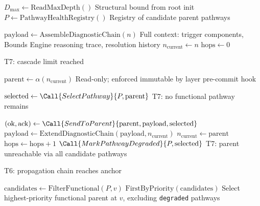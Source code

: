 \begin{algorithm}[t]
\caption{Escalation Algorithm}
\label{alg:escalation}
\begin{algorithmic}[1]
  \State $D_{\max} \gets \text{ReadMaxDepth}()$          \Comment Structural bound from root init
  \State $P \gets \text{PathwayHealthRegistry}()$      \Comment Registry of candidate parent pathways

  \State $\text{payload} \gets \text{AssembleDiagnosticChain}(n)$
  \Comment Full context: trigger components, Bounds Engine reasoning trace, resolution history
  \State $n_{\text{current}} \gets n$
  \State $\text{hops} \gets 0$

      \State \Return {}
      \Comment T7: cascade limit reached
    \EndIf

    \State $\text{parent} \gets \alpha(n_{\text{current}})$
    \Comment Read-only; enforced immutable by \fact{} layer pre-commit hook

    \State $\text{selected} \gets \Call{SelectPathway}{P, \text{parent}}$
      \State \Return {}
      \Comment T7: no functional pathway remains
    \EndIf

    \State $(\text{ok}, \text{ack}) \gets \Call{SendToParent}{\text{parent}, \text{payload}, \text{selected}}$
      \State $\text{payload} \gets \text{ExtendDiagnosticChain}(\text{payload}, n_{\text{current}})$
      \State $n_{\text{current}} \gets \text{parent}$
      \State $\text{hops} \gets \text{hops} + 1$
    \Else
      \State $\Call{MarkPathwayDegraded}{P, \text{selected}}$
      \State \Return {}
      \Comment T7: parent unreachable via all candidate pathways
    \EndIf
  \EndWhile

  \State {}
  \State \Return {}
  \Comment T6: propagation chain reaches anchor
\EndFunction

\Statex
{}
  \State $\text{candidates} \gets \text{FilterFunctional}(P, v)$
  \State \Return $\text{FirstByPriority}(\text{candidates})$
  \Comment Select highest-priority functional parent at $v$, excluding \texttt{degraded} pathways
\EndFunction
\end{algorithmic}
\end{algorithm}

